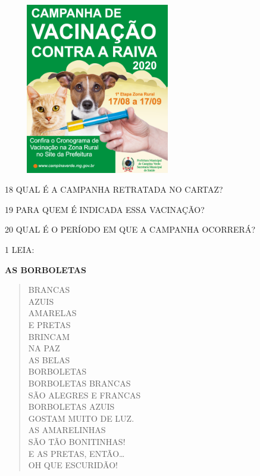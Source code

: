 \includegraphics[width=3.23444in,height=2.93410in]{media/image131.png}

\num{18} QUAL É A CAMPANHA RETRATADA NO CARTAZ?


\num{19} PARA QUEM É INDICADA ESSA VACINAÇÃO?


\num{20} QUAL É O PERÍODO EM QUE A CAMPANHA OCORRERÁ?




\num{1} LEIA:

\textbf{AS BORBOLETAS}

\begin{verse}
BRANCAS\\
AZUIS\\
AMARELAS\\
E PRETAS\\
BRINCAM\\
NA PAZ\\
AS BELAS\\
BORBOLETAS\\
BORBOLETAS BRANCAS\\
SÃO ALEGRES E FRANCAS\\
BORBOLETAS AZUIS\\
GOSTAM MUITO DE LUZ.\\
AS AMARELINHAS\\
SÃO TÃO BONITINHAS!\\
E AS PRETAS, ENTÃO\ldots{}\\
OH QUE ESCURIDÃO!
\end{verse}

